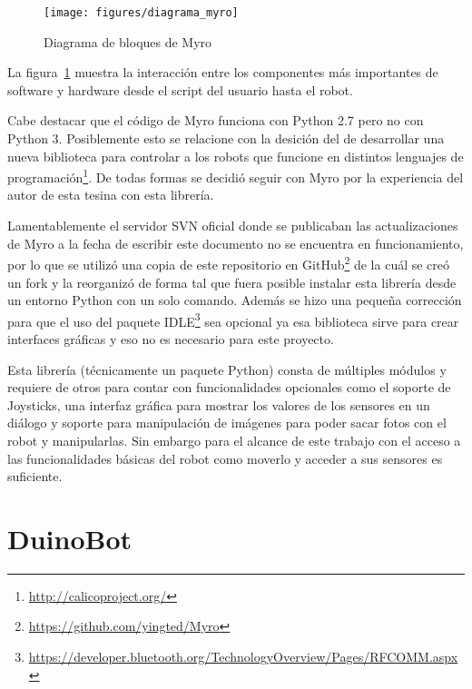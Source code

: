 \begin{figure}
    \centering
    \texttt{[image: figures/diagrama\_myro]}
    \caption{Diagrama de bloques de Myro}\label{fig:diagrama_myro}
\end{figure}

La figura~\ref{fig:diagrama_myro} muestra la interacción entre los componentes
más importantes de software y hardware desde el script del usuario hasta el
robot.

Cabe destacar que el código de Myro funciona con Python 2.7 pero no con
Python 3. Posiblemente esto se relacione con la desición del \ipre{}
de desarrollar una nueva biblioteca para controlar a los robots que funcione
en distintos lenguajes de
programación\footnote{\url{http://calicoproject.org/}}. De todas formas se
decidió seguir con Myro por la experiencia del autor de esta tesina
con esta librería.

Lamentablemente el servidor SVN oficial donde se publicaban las
actualizaciones de Myro a la fecha de escribir este documento
no se encuentra en funcionamiento, por lo que se utilizó una
copia de este repositorio en
GitHub\footnote{\url{https://github.com/yingted/Myro}} de la cuál
se creó un fork y la reorganizó de forma tal que fuera posible instalar
esta librería desde un entorno Python con un solo comando.
Además se hizo
una pequeña corrección para que el uso del paquete
IDLE\footnote{\url{https://developer.bluetooth.org/TechnologyOverview/Pages/RFCOMM.aspx}}
sea opcional ya esa biblioteca sirve para crear interfaces gráficas
y eso no es necesario para este proyecto.

Esta librería (técnicamente un paquete Python) consta de múltiples
módulos y requiere de otros para contar con funcionalidades opcionales
como el soporte de Joysticks, una interfaz gráfica para mostrar
los valores de los sensores en un diálogo y soporte para manipulación
de imágenes para poder sacar fotos con el robot y manipularlas. Sin
embargo para el alcance de este trabajo con el acceso a las funcionalidades
básicas del robot como moverlo y acceder a sus sensores es suficiente.


\section{DuinoBot}\label{sec:duinobot}

